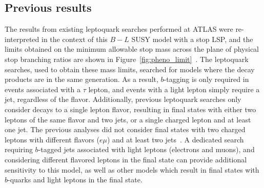 \subsection{Previous results}

The results from existing leptoquark searches performed at ATLAS were
re-interpreted in the context of this $B-L$ SUSY model with a stop LSP, and the
limits obtained on the minimum allowable stop mass across the plane of
physical stop branching ratios are shown in
Figure~\ref{fig:pheno_limit}~\cite{Marshall:2014cwa,Marshall:2014kea}.
The leptoquark searches, used to obtain these mass limits, searched for
models where the decay products are in the same generation.
As a result, $b$-tagging is only required in events associated with a $\tau$
lepton, and events with a light lepton simply require a jet, regardless of the
flavor.
Additionally, previous leptoquark searches only consider decays to a single
lepton flavor, resulting in final states with either two leptons of the same
flavor and two jets, or a single charged lepton and at least one jet.
The previous analyses did not consider final states with two charged leptons
with different flavors ($e\mu$) and at least two 
jets~\cite{ATLAS:2013oea, ATLAS:2012aq, Aad:2011ch, CMS:2014qpa,
  Chatrchyan:2012sv, Chatrchyan:2012vza, Chatrchyan:2012st}.
A dedicated search requiring $b$-tagged jets associated with light leptons
(electrons and muons), and considering different flavored leptons in the final
state can provide additional sensitivity to this model, as well as other models
which result in final states with $b$-quarks and light leptons in the final
state.

\begin{figure}[p]
\end{figure}

